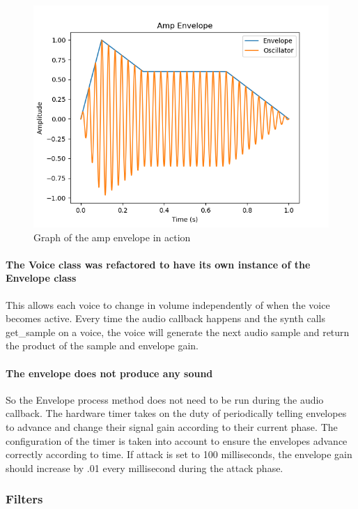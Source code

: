 \documentclass[acmlarge,screen]{acmart}
\begin{document}
	\begin{figure}
		\centering
		\includegraphics[width=.8\linewidth]{amp_envelope_visual}
		\caption{Graph of the amp envelope in action}
	\end{figure}
	
	\paragraph{The Voice class was refactored to have its own instance of the Envelope class} This allows each voice to change in volume independently of when the voice becomes active. Every time the audio callback happens and the synth calls get\_sample on a voice, the voice will generate the next audio sample and return the product of the sample and envelope gain.
	
	\paragraph{The envelope does not produce any sound} So the Envelope process method does not need to be run during the audio callback. The hardware timer takes on the duty of periodically telling envelopes to advance and change their signal gain according to their current phase. The configuration of the timer is taken into account to ensure the envelopes advance correctly according to time. If attack is set to 100 milliseconds, the envelope gain should increase by .01 every millisecond during the attack phase.
	
	\subsubsection{Filters}
\end{document}
